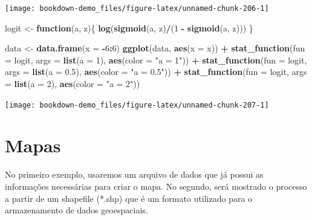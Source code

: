 \documentclass[]{book}
\newenvironment{Shaded}{\begin{snugshade}}{\end{snugshade}}
\newcommand{\KeywordTok}[1]{\textcolor[rgb]{0.13,0.29,0.53}{\textbf{#1}}}
\newcommand{\DataTypeTok}[1]{\textcolor[rgb]{0.13,0.29,0.53}{#1}}
\newcommand{\DecValTok}[1]{\textcolor[rgb]{0.00,0.00,0.81}{#1}}
\newcommand{\FloatTok}[1]{\textcolor[rgb]{0.00,0.00,0.81}{#1}}
\newcommand{\StringTok}[1]{\textcolor[rgb]{0.31,0.60,0.02}{#1}}
\newcommand{\ControlFlowTok}[1]{\textcolor[rgb]{0.13,0.29,0.53}{\textbf{#1}}}
\newcommand{\OperatorTok}[1]{\textcolor[rgb]{0.81,0.36,0.00}{\textbf{#1}}}
\newcommand{\NormalTok}[1]{#1}
\begin{document}
\begin{center}\texttt{[image: bookdown-demo\_files/figure-latex/unnamed-chunk-206-1]} \end{center}

\begin{Shaded}
\begin{Highlighting}[]
\NormalTok{logit <-}\StringTok{ }\ControlFlowTok{function}\NormalTok{(a, z)\{}
  \KeywordTok{log}\NormalTok{(}\KeywordTok{sigmoid}\NormalTok{(a, z)}\OperatorTok{/}\NormalTok{(}\DecValTok{1} \OperatorTok{-}\StringTok{ }\KeywordTok{sigmoid}\NormalTok{(a, z)))}
\NormalTok{\}}

\NormalTok{data <-}\StringTok{ }\KeywordTok{data.frame}\NormalTok{(}\DataTypeTok{x =} \OperatorTok{-}\DecValTok{6}\OperatorTok{:}\DecValTok{6}\NormalTok{)}
\KeywordTok{ggplot}\NormalTok{(data, }\KeywordTok{aes}\NormalTok{(}\DataTypeTok{x =}\NormalTok{ x)) }\OperatorTok{+}
\StringTok{  }\KeywordTok{stat_function}\NormalTok{(}\DataTypeTok{fun =}\NormalTok{ logit, }\DataTypeTok{args =} \KeywordTok{list}\NormalTok{(}\DataTypeTok{a =} \DecValTok{1}\NormalTok{), }\KeywordTok{aes}\NormalTok{(}\DataTypeTok{color =} \StringTok{"a = 1"}\NormalTok{)) }\OperatorTok{+}
\StringTok{  }\KeywordTok{stat_function}\NormalTok{(}\DataTypeTok{fun =}\NormalTok{ logit, }\DataTypeTok{args =} \KeywordTok{list}\NormalTok{(}\DataTypeTok{a =} \FloatTok{0.5}\NormalTok{), }\KeywordTok{aes}\NormalTok{(}\DataTypeTok{color =} \StringTok{"a = 0.5"}\NormalTok{)) }\OperatorTok{+}
\StringTok{  }\KeywordTok{stat_function}\NormalTok{(}\DataTypeTok{fun =}\NormalTok{ logit, }\DataTypeTok{args =} \KeywordTok{list}\NormalTok{(}\DataTypeTok{a =} \DecValTok{2}\NormalTok{), }\KeywordTok{aes}\NormalTok{(}\DataTypeTok{color =} \StringTok{"a = 2"}\NormalTok{)) }
\end{Highlighting}
\end{Shaded}

\begin{center}\texttt{[image: bookdown-demo\_files/figure-latex/unnamed-chunk-207-1]} \end{center}

\section{Mapas}\label{mapas}

No primeiro exemplo, usaremos um arquivo de dados que já possui as
informações necessárias para criar o mapa. No segundo, será mostrado o
processo a partir de um shapefile (*.shp) que é um formato utilizado
para o armazenamento de dados geoespaciais.
\end{document}
